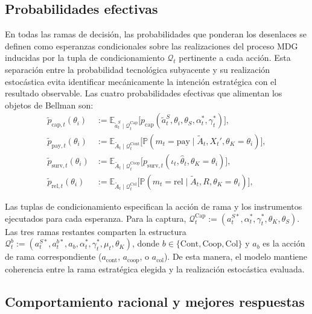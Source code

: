 \documentclass[review,authoryear,12pt]{elsarticle}
\theoremstyle{plain}
\theoremstyle{definition}
\newcommand{\E}{\mathbb{E}}
\newcommand{\Prob}{\mathbb{P}}
\newcommand{\1}{\mathbf{1}}
\begin{document}
\subsection{Probabilidades efectivas}\label{subsec:prob-efectivas}

En todas las ramas de decisión, las probabilidades que ponderan los desenlaces se definen como esperanzas condicionales sobre las realizaciones del proceso MDG inducidas por la tupla de condicionamiento $\mathcal{Q}_t$ pertinente a cada acción. Esta separación entre la probabilidad tecnológica subyacente y su realización estocástica evita identificar mecánicamente la intención estratégica con el resultado observable. Las cuatro probabilidades efectivas que alimentan los objetos de Bellman son:
\begin{align}
\tilde{p}_{\mathrm{cap},t}(\theta_i)
&:=\E_{\tilde{a}_t^S\mid\mathcal{Q}_t^{\mathrm{Cap}}}\!\bigl[p_{\mathrm{cap}}(\tilde{a}_t^S,\theta_i,\theta_S,\alpha_t^\ast,\gamma_t^\ast)\bigr],\label{eq:p-cap-eff}\\
\tilde{p}_{\mathrm{pay},t}(\theta_i)
&:=\E_{\tilde{A}_t\mid\mathcal{Q}_t^{\mathrm{Cont}}}\!\bigl[\Prob(m_t=\mathrm{pay}\mid\tilde{A}_t,X_t',\theta_K=\theta_i)\bigr],\label{eq:p-pay-eff}\\
\tilde{p}_{\mathrm{surv},t}(\theta_i)
&:=\E_{\tilde{A}_t\mid\mathcal{Q}_t^{\mathrm{Coop}}}\!\bigl[p_{\mathrm{surv},t}(\iota_t,\hat{\theta}_t,\theta_K=\theta_i)\bigr],\label{eq:p-surv-eff}\\
\tilde{p}_{\mathrm{rel},t}(\theta_i)
&:=\E_{\tilde{A}_t\mid\mathcal{Q}_t^{\mathrm{Col}}}\!\bigl[\Prob(m_t=\mathrm{rel}\mid\tilde{A}_t,R,\theta_K=\theta_i)\bigr],\label{eq:p-rel-eff}
\end{align}

Las tuplas de condicionamiento especifican la acción de rama y los instrumentos ejecutados para cada esperanza. Para la captura, $\mathcal{Q}_t^{\mathrm{Cap}}:=(a_t^{S\ast},\alpha_t^\ast,\gamma_t^\ast,\theta_K,\theta_S)$. Las tres ramas restantes comparten la estructura $\mathcal{Q}_t^{b}:=(a_t^{S\ast},a_t^{b\ast},a_b,\alpha_t^\ast,\gamma_t^\ast,\mu_t,\theta_K)$, donde $b\in\{\mathrm{Cont},\mathrm{Coop},\mathrm{Col}\}$ y $a_b$ es la acción de rama correspondiente ($a_{\mathrm{cont}}$, $a_{\mathrm{coop}}$, o $a_{\mathrm{col}}$). De esta manera, el modelo mantiene coherencia entre la rama estratégica elegida y la realización estocástica evaluada.

\subsection{Comportamiento racional y mejores respuestas}\label{subsec:bellman}
\end{document}
